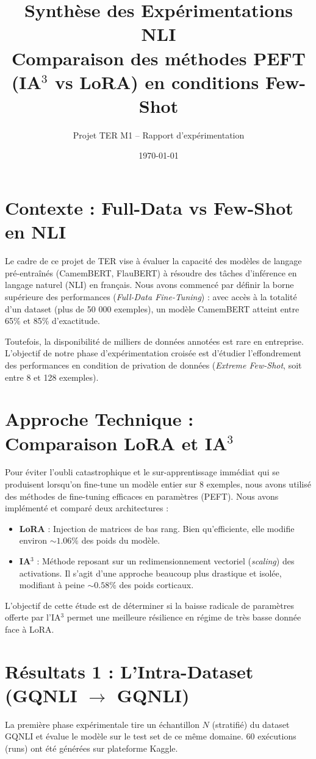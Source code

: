 \documentclass[11pt, a4paper]{article}
\title{\textbf{Synthèse des Expérimentations NLI} \\ \Large{Comparaison des méthodes PEFT (IA$^3$ vs LoRA) en conditions Few-Shot}}
\author{Projet TER M1 -- Rapport d'expérimentation}
\date{\today}
\begin{document}
\maketitle

\section{Contexte : Full-Data vs Few-Shot en NLI}
Le cadre de ce projet de TER vise à évaluer la capacité des modèles de langage pré-entraînés (CamemBERT, FlauBERT) à résoudre des tâches d'inférence en langage naturel (NLI) en français.
Nous avons commencé par définir la borne supérieure des performances (\textit{Full-Data Fine-Tuning}) : avec accès à la totalité d'un dataset (plus de 50 000 exemples), un modèle CamemBERT atteint entre 65\% et 85\% d'exactitude.

Toutefois, la disponibilité de milliers de données annotées est rare en entreprise. L'objectif de notre phase d'expérimentation croisée est d'étudier l'effondrement des performances en condition de privation de données (\textit{Extreme Few-Shot}, soit entre 8 et 128 exemples).

\section{Approche Technique : Comparaison LoRA et IA$^3$}
Pour éviter l'oubli catastrophique et le sur-apprentissage immédiat qui se produisent lorsqu'on fine-tune un modèle entier sur 8 exemples, nous avons utilisé des méthodes de fine-tuning efficaces en paramètres (PEFT).
Nous avons implémenté et comparé deux architectures :
\begin{itemize}
    \item \textbf{LoRA} : Injection de matrices de bas rang. Bien qu'efficiente, elle modifie environ $\sim 1.06\%$ des poids du modèle.
    \item \textbf{IA$^3$} : Méthode reposant sur un redimensionnement vectoriel (\textit{scaling}) des activations. Il s'agit d'une approche beaucoup plus drastique et isolée, modifiant à peine $\sim 0.58\%$ des poids corticaux.
\end{itemize}

L'objectif de cette étude est de déterminer si la baisse radicale de paramètres offerte par l'IA$^3$ permet une meilleure résilience en régime de très basse donnée face à LoRA.

\section{Résultats 1 : L'Intra-Dataset (GQNLI $\rightarrow$ GQNLI)}
La première phase expérimentale tire un échantillon $N$ (stratifié) du dataset GQNLI et évalue le modèle sur le test set de ce même domaine. 60 exécutions (runs) ont été générées sur plateforme Kaggle.
\end{document}
